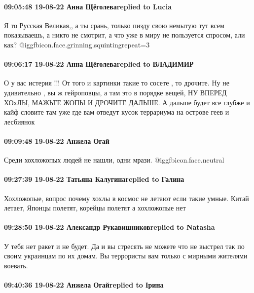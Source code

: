 \paragraph{09:05:48 19-08-22 Анна Щёголеваreplied to Lucia}

Я то Русская Великая,, а ты срань, только пизду свою немытую тут всем
показываешь, а никто не смотрит, а что уже в миру не пользуется спросом, али
как? @igg{fbicon.face.grinning.squinting}{repeat=3} 

\paragraph{09:06:17 19-08-22 Анна Щёголеваreplied to ВЛАДИМИР}

О у вас истерия !!! От того и картинки такие то сосете , то дрочите. Ну не
удивительно , вы ж гейроповцы, а там это в порядке вещей, НУ ВПЕРЕД ХОхЛЫ,
МАЖЬТЕ ЖОПЫ И ДРОЧИТЕ ДАЛЬШЕ. А дальше будет все глубже и кайф словите там уже
где вам отведут кусок террариума на острове геев и лесбиянок

\paragraph{09:09:48 19-08-22 Анжела Огай}

Среди хохложопых людей не нашли, одни мрази. @igg{fbicon.face.neutral} 

\paragraph{09:27:39 19-08-22 Татьяна Калугинаreplied to Галина}

Хохложопые, вопрос почему хохлы в космос не летают если такие умные. Китай
летает, Японцы полетят, корейцы полетят а хохложопые нет

\paragraph{09:28:50 19-08-22 Александр Рукавишниковreplied to Natasha}

У тебя нет ракет и не будет. Да и вы стресять не можете что не выстрел так по
своим украинцам по их домам. Вы террористы вам только с мирными жителями
воевать.

\paragraph{09:40:36 19-08-22 Анжела Огайreplied to Ірина}


